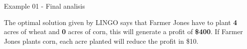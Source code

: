 \begin{frame}{Example 01 - Final analisis}

The optimal solution given by LINGO says that Farmer Jones have to plant
\textbf{4} acres of wheat and \textbf{0} acres of corn, this will generate a
profit of \textbf{\$400}. If Farmer Jones plants corn, each acre planted will
reduce the profit in \$10.

\end{frame}
